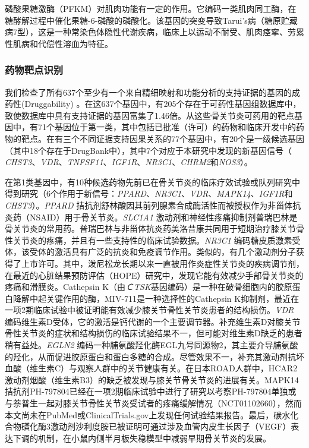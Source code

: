 磷酸果糖激酶（PFKM）对肌肉功能有一定的作用。它编码一类肌肉同工酶，在糖酵解过程中催化果糖-6-磷酸的磷酸化。该基因的突变导致Tarui's病（糖原贮藏病7型），这是一种常染色体隐性代谢疾病，临床上以运动不耐受、肌肉痉挛、劳累性肌病和代偿性溶血为特征。

\subsubsection*{药物靶点识别}

我们检查了所有637个至少有一个来自精细映射和功能分析的支持证据的基因的成药性(Druggability)
。在这637个基因中，有205个存在于可药性基因组数据库中，致使数据库中具有支持证据的基因富集了1.46倍。从这些骨关节炎可药用的靶点基因中，有71个基因位于第一类，其中包括已批准（许可）的药物和临床开发中的药物的靶点。在有三个不同证据支持因果关系的77个基因中，有20个是一级候选基因（其中18个存在于DrugBank中），其中7个对应于本研究中发现的新基因信号（\emph{
CHST3}、\emph{VDR}、\emph{TNFSF11}、\emph{IGF1R}、\emph{NR3C1}、\emph{CHRM2}和\emph{NOS3}）。

在第1类基因中，有10种候选药物先前已在骨关节炎的临床疗效试验或队列研究中得到研究（6个作用于新信号：\emph{PPARD}、\emph{NR3C1}、\emph{VDR}、\emph{MAPK14}、\emph{IGF1R}和\emph{CHST3}）。\emph{PPARD}
拮抗剂舒林酸因其前列腺素合成酶活性而被授权作为非甾体抗炎药（NSAID）用于骨关节炎。\emph{SLC1A1}
激动剂和神经性疼痛抑制剂普瑞巴林是骨关节炎的常用药。普瑞巴林与非甾体抗炎药美洛昔康共同用于短期治疗膝关节骨性关节炎的疼痛，并且有一些支持性的临床试验数据。\emph{NR3C1}
编码糖皮质激素受体，该受体的激活具有广泛的抗炎和免疫调节作用。类似的，有几个激动剂分子获得了上市许可。其中，泼尼松龙长期以来一直被用作炎症性关节炎的疾病调节剂，在最近的心脏结果预防评估（HOPE）研究中，发现它能有效减少手部骨关节炎的疼痛和滑膜炎。Cathepsin
K（由\emph{ＣTSK}基因编码）是一种在破骨细胞内的胶原蛋白降解中起关键作用的酶，MIV-711是一种选择性的Cathepsin
K抑制剂，最近在一项2期临床试验中被证明能有效减少膝关节骨性关节炎患者的结构损伤。\emph{VDR}
编码维生素D受体，它的激活是钙代谢的一个主要调节器。补充维生素D对膝关节骨性关节炎的症状和结构损伤的临床试验结果不一，但可能对维生素D缺乏的患者稍有益处。\emph{EGLN2}
编码一种脯氨酸羟化酶EGL九号同源物2，其主要介导脯氨酸的羟化，从而促进胶原蛋白和蛋白多糖的合成。尽管效果不一，补充其激动剂抗坏血酸（维生素C）与观察人群中的关节健康有关。在日本ROAD人群中，HCAR2激动剂烟酸（维生素B3）的缺乏被发现与膝关节骨关节炎的进展有关。MAPK14拮抗剂PH-797804已经在一项2期临床试验中进行了研究以考察PH-797804单独或与萘普生一起对膝关节骨性关节炎受试者的疼痛缓解情况（NCT01102660），然而本文尚未在PubMed或ClinicalTrials.gov上发现任何试验结果报告。最后，碳水化合物磺化酶3激动剂沙利度胺已被证明可通过涉及血管内皮生长因子（VEGF）表达下调的机制，在小鼠内侧半月板失稳模型中减弱早期骨关节炎的发展。

